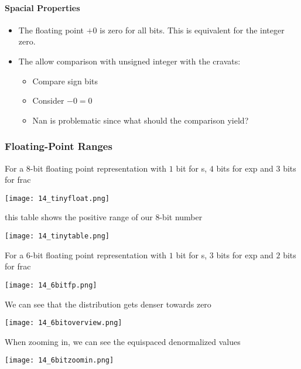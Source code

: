 \paragraph{Spacial Properties}
\begin{itemize}
    \item The floating point $+0$ is zero for all bits. This is equivalent for the integer zero.
    \item The allow comparison with unsigned integer with the cravats:
        \begin{itemize}
            \item Compare sign bits
            \item Consider $-0 = 0$
            \item Nan is problematic since what should the comparison yield?
        \end{itemize}
\end{itemize}

\subsubsection{Floating-Point Ranges}
For a $8$-bit floating point representation with $1$ bit for s, $4$ bits for exp and $3$ bits for frac

\texttt{[image: 14\_tinyfloat.png]}

this table shows the positive range of our $8$-bit number

\texttt{[image: 14\_tinytable.png]}

For a $6$-bit floating point representation with $1$ bit for s, $3$ bits for exp and $2$ bits for frac

\texttt{[image: 14\_6bitfp.png]}

We can see that the distribution gets denser towards zero

\texttt{[image: 14\_6bitoverview.png]}

When zooming in, we can see the equispaced denormalized values

\texttt{[image: 14\_6bitzoomin.png]}

